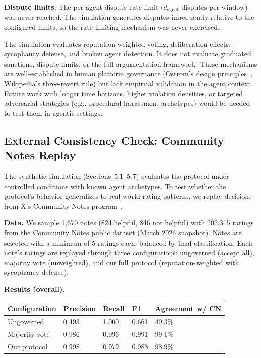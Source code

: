 \documentclass[11pt]{article}
\begin{document}
\textbf{Dispute limits.} The per-agent dispute rate limit ($d_{\text{agent}}$ disputes per window) was never reached. The simulation generates disputes infrequently relative to the configured limits, so the rate-limiting mechanism was never exercised.

The simulation evaluates reputation-weighted voting, deliberation effects, sycophancy defense, and broken agent detection. It does not evaluate graduated sanctions, dispute limits, or the full argumentation framework. These mechanisms are well-established in human platform governance (Ostrom's design principles~\cite{ostrom1990}, Wikipedia's three-revert rule) but lack empirical validation in the agent context. Future work with longer time horizons, higher violation densities, or targeted adversarial strategies (e.g., procedural harassment archetypes) would be needed to test them in agentic settings.

\subsection{External Consistency Check: Community Notes Replay}

The synthetic simulation (Sections~5.1--5.7) evaluates the protocol under controlled conditions with known agent archetypes. To test whether the protocol's behavior generalizes to real-world rating patterns, we replay decisions from X's Community Notes program~\cite{communitynotes2023, wojcik2022}.

\textbf{Data.} We sample 1,670 notes (824 helpful, 846 not helpful) with 202,315 ratings from the Community Notes public dataset (March 2026 snapshot). Notes are selected with a minimum of 5 ratings each, balanced by final classification. Each note's ratings are replayed through three configurations: ungoverned (accept all), majority vote (unweighted), and our full protocol (reputation-weighted with sycophancy defense).

\textbf{Results (overall).}

\begin{table}[h]
\centering
\small
\begin{tabular}{lllll}
\toprule
\textbf{Configuration} & \textbf{Precision} & \textbf{Recall} & \textbf{F1} & \textbf{Agreement w/ CN} \\
\midrule
Ungoverned & 0.493 & 1.000 & 0.661 & 49.3\% \\
Majority vote & 0.986 & 0.996 & 0.991 & 99.1\% \\
Our protocol & 0.998 & 0.979 & 0.988 & 98.9\% \\
\bottomrule
\end{tabular}
\end{table}
\end{document}
